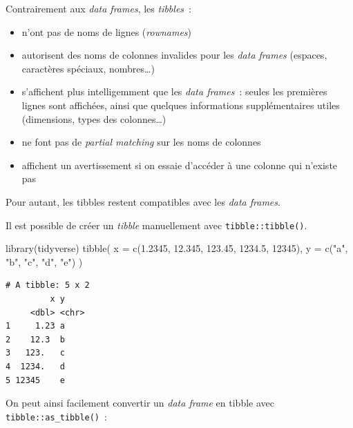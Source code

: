 \documentclass[
  letterpaper,
  DIV=11,
  numbers=noendperiod,
  oneside]{scrreprt}
\newenvironment{Shaded}{\begin{snugshade}}{\end{snugshade}}
\newcommand{\AttributeTok}[1]{\textcolor[rgb]{0.40,0.45,0.13}{#1}}
\newcommand{\DecValTok}[1]{\textcolor[rgb]{0.68,0.00,0.00}{#1}}
\newcommand{\FloatTok}[1]{\textcolor[rgb]{0.68,0.00,0.00}{#1}}
\newcommand{\FunctionTok}[1]{\textcolor[rgb]{0.28,0.35,0.67}{#1}}
\newcommand{\NormalTok}[1]{\textcolor[rgb]{0.00,0.23,0.31}{#1}}
\newcommand{\StringTok}[1]{\textcolor[rgb]{0.13,0.47,0.30}{#1}}
\providecommand{\tightlist}{%
  \setlength{\itemsep}{0pt}\setlength{\parskip}{0pt}}\usepackage{longtable,booktabs,array}
\begin{document}
Contrairement aux \emph{data frames}, les \emph{tibbles}~:

\begin{itemize}
\tightlist
\item
  n'ont pas de noms de lignes (\emph{rownames})
\item
  autorisent des noms de colonnes invalides pour les \emph{data frames}
  (espaces, caractères spéciaux, nombres\ldots) 
\item
  s'affichent plus intelligemment que les \emph{data frames}~: seules
  les premières lignes sont affichées, ainsi que quelques informations
  supplémentaires utiles (dimensions, types des colonnes\ldots)
\item
  ne font pas de \emph{partial matching} sur les noms de colonnes
\item
  affichent un avertissement si on essaie d'accéder à une colonne qui
  n'existe pas
\end{itemize}

Pour autant, les tibbles restent compatibles avec les \emph{data
frames}.

Il est possible de créer un \emph{tibble} manuellement avec
\texttt{tibble::tibble()}.

\begin{Shaded}
\begin{Highlighting}[]
\FunctionTok{library}\NormalTok{(tidyverse)}
\FunctionTok{tibble}\NormalTok{(}
  \AttributeTok{x =} \FunctionTok{c}\NormalTok{(}\FloatTok{1.2345}\NormalTok{, }\FloatTok{12.345}\NormalTok{, }\FloatTok{123.45}\NormalTok{, }\FloatTok{1234.5}\NormalTok{, }\DecValTok{12345}\NormalTok{),}
  \AttributeTok{y =} \FunctionTok{c}\NormalTok{(}\StringTok{"a"}\NormalTok{, }\StringTok{"b"}\NormalTok{, }\StringTok{"c"}\NormalTok{, }\StringTok{"d"}\NormalTok{, }\StringTok{"e"}\NormalTok{)}
\NormalTok{)}
\end{Highlighting}
\end{Shaded}

\begin{verbatim}
# A tibble: 5 x 2
         x y    
     <dbl> <chr>
1     1.23 a    
2    12.3  b    
3   123.   c    
4  1234.   d    
5 12345    e    
\end{verbatim}

On peut ainsi facilement convertir un \emph{data frame} en tibble avec
\texttt{tibble::as\_tibble()}~:
\end{document}
